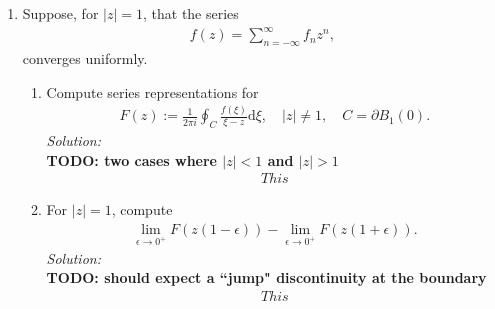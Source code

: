 \documentclass[10pt]{amsart}
\newcommand{\D}{\mathrm{d}}
\theoremstyle{nonumberplain}
\begin{document}
\begin{enumerate}[label={\bf {\arabic*}:}]
\item Suppose, for $|z| = 1$, that the series
\begin{align*}
f(z) = \sum_{n = -\infty}^\infty f_n z^n,
\end{align*}
converges uniformly.
\begin{enumerate}
\item Compute series representations for
\begin{align*}
F(z) := \frac{1}{2 \pi i} \oint_{C} \frac{f(\xi)}{\xi - z} \D \xi,
\quad |z| \neq 1, \quad C = \partial B_1(0).
\end{align*}
\textit{Solution:} \\
\textbf{TODO: two cases where $|z| < 1$ and $|z| > 1$}
\begin{align*}
This
\end{align*}

\item For $|z| = 1$, compute
\begin{align*}
\lim_{\epsilon \to 0^+} F( z(1 - \epsilon)) -       \lim_{\epsilon \to 0^+} F( z(1 + \epsilon)) .
\end{align*}
\textit{Solution:} \\
\textbf{TODO: should expect a ``jump" discontinuity at the boundary}
\begin{align*}
This
\end{align*}

\end{enumerate}
\end{enumerate}
\end{document}
